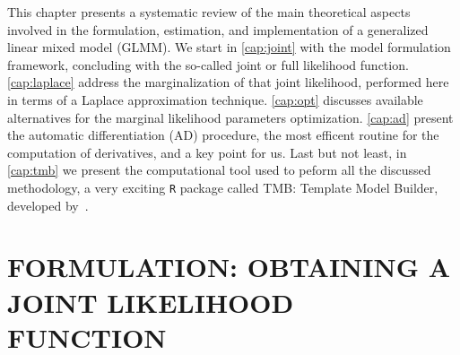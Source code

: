 This chapter presents a systematic review of the main theoretical
aspects involved in the formulation, estimation, and implementation of a
generalized linear mixed model (GLMM). We start in \autoref{cap:joint}
with the model formulation framework, concluding with the so-called
joint or full likelihood function. \autoref{cap:laplace} address the
marginalization of that joint likelihood, performed here in terms of a
Laplace approximation technique. \autoref{cap:opt} discusses available
alternatives for the marginal likelihood parameters optimization.
\autoref{cap:ad} present the automatic differentiation (AD) procedure,
the most efficent routine for the computation of derivatives, and a key
point for us. Last but not least, in \autoref{cap:tmb} we present the
computational tool used to peform all the discussed methodology, a very
exciting \texttt{R} \cite{R21} package called TMB: Template Model
Builder, developed by~.

\section{FORMULATION: OBTAINING A JOINT LIKELIHOOD FUNCTION}
\label{cap:joint}

